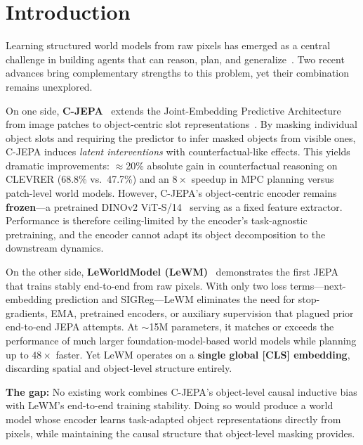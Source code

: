\documentclass[12pt]{article}
\begin{document}
\section{Introduction}

Learning structured world models from raw pixels has emerged as a central challenge in building agents that can reason, plan, and generalize~\citep{lecun2022}. Two recent advances bring complementary strengths to this problem, yet their combination remains unexplored.

On one side, \textbf{C-JEPA}~\citep{nam2026cjepa} extends the Joint-Embedding Predictive Architecture~\citep{assran2023ijepa} from image patches to object-centric slot representations~\citep{locatello2020slot}. By masking individual object slots and requiring the predictor to infer masked objects from visible ones, C-JEPA induces \emph{latent interventions} with counterfactual-like effects. This yields dramatic improvements: $\approx$20\% absolute gain in counterfactual reasoning on CLEVRER (68.8\% vs.\ 47.7\%) and an $8\times$ speedup in MPC planning versus patch-level world models. However, C-JEPA's object-centric encoder remains \textbf{frozen}---a pretrained DINOv2 ViT-S/14~\citep{oquab2023dinov2} serving as a fixed feature extractor. Performance is therefore ceiling-limited by the encoder's task-agnostic pretraining, and the encoder cannot adapt its object decomposition to the downstream dynamics.

On the other side, \textbf{LeWorldModel (LeWM)}~\citep{maes2026lewm} demonstrates the first JEPA that trains stably end-to-end from raw pixels. With only two loss terms---next-embedding prediction and SIGReg---LeWM eliminates the need for stop-gradients, EMA, pretrained encoders, or auxiliary supervision that plagued prior end-to-end JEPA attempts. At $\sim$15M parameters, it matches or exceeds the performance of much larger foundation-model-based world models while planning up to $48\times$ faster. Yet LeWM operates on a \textbf{single global [CLS] embedding}, discarding spatial and object-level structure entirely.

\textbf{The gap:} No existing work combines C-JEPA's object-level causal inductive bias with LeWM's end-to-end training stability. Doing so would produce a world model whose encoder learns task-adapted object representations directly from pixels, while maintaining the causal structure that object-level masking provides.
\end{document}
